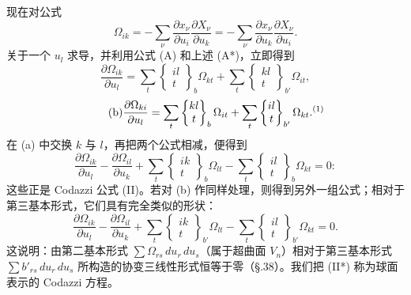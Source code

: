 现在对公式
\[
\Omega_{ik}=-\sum_\nu\frac{\partial x_\nu}{\partial u_i}\frac{\partial X_\nu}{\partial u_k}
=-\sum_\nu\frac{\partial x_\nu}{\partial u_k}\frac{\partial X_\nu}{\partial u_i}.
\]
关于一个 $u_l$ 求导，并利用公式 (A) 和上述 (A*)，立即得到
\[
\tag{a}
\frac{\partial\Omega_{ik}}{\partial u_l}
=\sum_t\left\{\begin{matrix}il\\ t\end{matrix}\right\}_{b}\Omega_{kt}
+\sum_t\left\{\begin{matrix}kl\\ t\end{matrix}\right\}_{b'}\Omega_{it},
\]
\[
\tag{b}
\frac{\partial\Omega_{ki}}{\partial u_l}
=\sum_t\left\{\begin{matrix}kl\\ t\end{matrix}\right\}_{b}\Omega_{it}
+\sum_t\left\{\begin{matrix}il\\ t\end{matrix}\right\}_{b'}\Omega_{kt}.\scanrestoredsrcfnmark{1}
\]
在 (a) 中交换 $k$ 与 $l$，再把两个公式相减，便得到
\[
\frac{\partial\Omega_{ik}}{\partial u_l}
-\frac{\partial\Omega_{il}}{\partial u_k}
+\sum_t\left\{\begin{matrix}ik\\ t\end{matrix}\right\}_{b}\Omega_{lt}
-\sum_t\left\{\begin{matrix}il\\ t\end{matrix}\right\}_{b}\Omega_{kt}=0:
\]
这些正是 Codazzi 公式 (II)。若对 (b) 作同样处理，则得到另外一组公式；相对于第三基本形式，它们具有完全类似的形状：
\[
\tag{II*}
\frac{\partial\Omega_{ik}}{\partial u_l}
-\frac{\partial\Omega_{il}}{\partial u_k}
+\sum_t\left\{\begin{matrix}ik\\ t\end{matrix}\right\}_{b'}\Omega_{lt}
-\sum_t\left\{\begin{matrix}il\\ t\end{matrix}\right\}_{b'}\Omega_{kt}=0 .
\]
这说明：由第二基本形式 $\sum\Omega_{rs}\,du_r\,du_s$（属于超曲面 $V_n$）相对于第三基本形式 $\sum b'_{rs}\,du_r\,du_s$ 所构造的协变三线性形式恒等于零（\S.38）。我们把 (II*) 称为球面表示的 Codazzi 方程。

